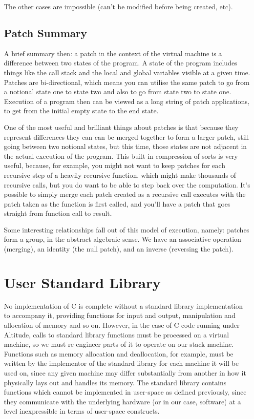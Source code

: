\documentclass[10pt,a4paper]{report}
\begin{document}
The other cases are impossible (can't be modified before being created, etc). 

\subsection{Patch Summary}
A brief summary then: a patch in the context of the virtual machine is a difference between two states of the program. A state of the program includes things like the call stack and the local and global variables visible at a given time. Patches are bi-directional, which means you can utilise the same patch to go from a notional state one to state two and also to go from state two to state one. Execution of a program then can be viewed as a long string of patch applications, to get from the initial empty state to the end state. 

One of the most useful and brilliant things about patches is that because they represent differences they can can be merged together to form a larger patch, still going between two notional states, but this time, those states are not adjacent in the actual execution of the program. This built-in compression of sorts is very useful, because, for example, you might not want to keep patches for each recursive step of a heavily recursive function, which might make thousands of recursive calls, but you do want to be able to step back over the computation. It's possible to simply merge each patch created as a recursive call executes with the patch taken as the function is first called, and you'll have a patch that goes straight from function call to result.

Some interesting relationships fall out of this model of execution, namely: patches form a group, in the abstract algebraic sense. We have an associative operation (merging), an identity (the null patch), and an inverse (reversing the patch).

\section{User Standard Library}
No implementation of C is complete without a standard library implementation to accompany it, providing functions for input and output, manipulation and allocation of memory and so on. However, in the case of C code running under Altitude, calls to standard library functions must be processed on a virtual machine, so we must re-engineer parts of it to operate on our stack machine. Functions such as memory allocation and deallocation, for example, must be written by the implementor of the standard library for each machine it will be used on, since any given machine may differ substantially from another in how it physically lays out and handles its memory. The standard library contains functions which cannot be implemented in user-space as defined previously, since they communicate with the underlying hardware (or in our case, software) at a level inexpressible in terms of user-space constructs.
\end{document}
